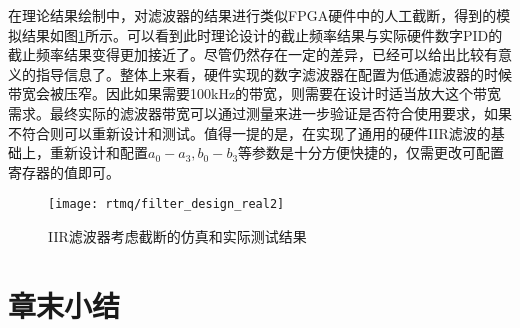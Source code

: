 在理论结果绘制中，对滤波器的结果进行类似FPGA硬件中的人工截断，得到的模拟结果如图\ref{fig:filter_design_real2}所示。可以看到此时理论设计的截止频率结果与实际硬件数字PID的截止频率结果变得更加接近了。尽管仍然存在一定的差异，已经可以给出比较有意义的指导信息了。整体上来看，硬件实现的数字滤波器在配置为低通滤波器的时候带宽会被压窄。因此如果需要100kHz的带宽，则需要在设计时适当放大这个带宽需求。最终实际的滤波器带宽可以通过测量来进一步验证是否符合使用要求，如果不符合则可以重新设计和测试。值得一提的是，在实现了通用的硬件IIR滤波的基础上，重新设计和配置$a_0-a_3, b_0-b_3$等参数是十分方便快捷的，仅需更改可配置寄存器的值即可。

\begin{figure}
    \centering
    \caption[IIR滤波器考虑截断的仿真和实际测试结果]{IIR滤波器考虑截断的仿真和实际测试结果\label{fig:filter_design_real2}}
    \texttt{[image: rtmq/filter\_design\_real2]}
\end{figure}


\section[章末小结]{章末小结}
